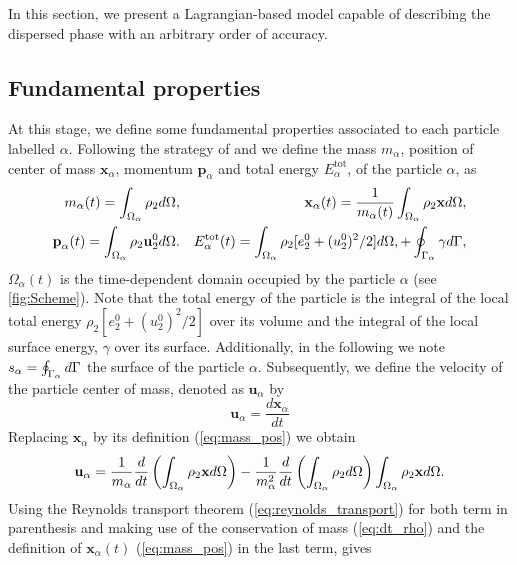 
In this section, we present a Lagrangian-based model capable of describing the dispersed phase with an arbitrary order of accuracy.

\subsection{Fundamental properties}

At this stage, we define some fundamental properties associated to each particle labelled $\alpha$.
Following the strategy of \citet{lhuillier2009rheology,lhuillier1992volume,zaepffel2011modelisation} and \citet[Chapter 2]{morel2015mathematical}
we define the mass $m_\alpha$, position of center of mass $\mathbf{x}_\alpha$, momentum $\textbf{p}_\alpha$ and total energy $E_\alpha^\text{tot}$, of the particle $\alpha$, as
\begin{align}
    m_\alpha(t)
    = \int_{\Omega_\alpha}  \rho_2   d\Omega, 
    &&
    \textbf{x}_\alpha(t)
    = \frac{1}{m_\alpha(t) }\int_{\Omega_\alpha}  \rho_2 \textbf{x}  d\Omega, 
    \label{eq:mass_pos}
    \\
    \textbf{p}_\alpha(t) 
    = \int_{\Omega_\alpha}  \rho_2 \textbf{u}_2^0  d\Omega.
    &&
     E_\alpha^\text{tot}(t) 
    = \int_{\Omega_\alpha}  \rho_2 [e_2^0 + (u_2^0)^2/2]  d\Omega,
    + \oint_{\Gamma_\alpha}  \gamma  d\Gamma,
    \label{eq:momentum_energy}
\end{align}
 $\Omega_\alpha(t)$ is the time-dependent domain occupied by the particle $\alpha$ (see \ref{fig:Scheme}). 
Note that the total energy of the particle is the integral of the local total energy $\rho_2 [e_2^0 + (u_2^0)^2/2]$ over its volume and the integral of the local surface energy, $\gamma$ over its surface. 
Additionally, in the following we note $s_\alpha = \oint_{\Gamma_\alpha}  d\Gamma$ the surface of the particle $\alpha$. 
Subsequently, we define the velocity of the particle center of mass, denoted as $\textbf{u}_\alpha$ by 
\begin{equation}
\textbf{u}_\alpha = \frac{d \textbf{x}_\alpha}{dt}  
\end{equation}
Replacing $\textbf{x}_\alpha$ by its definition (\ref{eq:mass_pos}) we obtain
\begin{equation}
    \textbf{u}_\alpha = \frac{1}{m_\alpha}
    \frac{d}{dt} 
    \left(
        \int_{\Omega_\alpha}  \rho_2 \textbf{x}  d\Omega
    \right)
    - \frac{1}{m_\alpha^2} \frac{d}{dt} \left(\int_{\Omega_\alpha}  \rho_2  d\Omega \right)
    \int_{\Omega_\alpha}  \rho_2 \textbf{x}  d\Omega.
\end{equation}
Using the Reynolds transport theorem (\ref{eq:reynolds_transport}) for both term in parenthesis and making use of the conservation of mass (\ref{eq:dt_rho}) and the definition of $\textbf{x}_\alpha(t)$ (\ref{eq:mass_pos}) in the last term, gives
